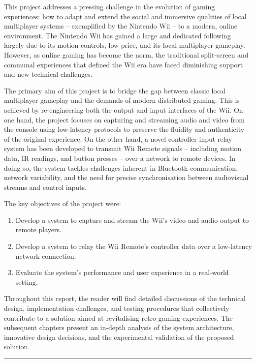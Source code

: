 \hypertarget{chapter:introduction}{}

This project addresses a pressing challenge in the evolution of gaming experiences: how to adapt and extend the social and immersive qualities of local multiplayer systems -- exemplified by the Nintendo Wii -- to a modern, online environment. The Nintendo Wii has gained a large and dedicated following largely due to its motion controls, low price, and its local multiplayer gameplay. However, as online gaming has become the norm, the traditional split-screen and communal experiences that defined the Wii era have faced diminishing support and new technical challenges.

The primary aim of this project is to bridge the gap between classic local multiplayer gameplay and the demands of modern distributed gaming. This is achieved by re-engineering both the output and input interfaces of the Wii. On one hand, the project focuses on capturing and streaming audio and video from the console using low-latency protocols to preserve the fluidity and authenticity of the original experience. On the other hand, a novel controller input relay system has been developed to transmit Wii Remote signals -- including motion data, IR readings, and button presses -- over a network to remote devices. In doing so, the system tackles challenges inherent in Bluetooth communication, network variability, and the need for precise synchronisation between audiovisual streams and control inputs.

The key objectives of the project were:
\begin{enumerate}
\item  Develop a system to capture and stream the Wii’s video and audio output to remote players.
\item Develop a system to relay the Wii Remote’s controller data over a low-latency network connection.
\item Evaluate the system’s performance and user experience in a real-world setting.
\end{enumerate}

Throughout this report, the reader will find detailed discussions of the technical design, implementation challenges, and testing procedures that collectively contribute to a solution aimed at revitalising retro gaming experiences. The subsequent chapters present an in-depth analysis of the system architecture, innovative design decisions, and the experimental validation of the proposed solution.


\begin{center}
	\noindent\rule{8cm}{0.4pt}
\end{center}



